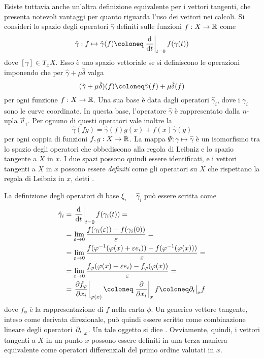 Esiste tuttavia anche un'altra definizione equivalente per i vettori tangenti, che presenta notevoli vantaggi per quanto riguarda l'uso dei vettori nei calcoli. Si consideri lo spazio degli operatori $\hat{\gamma}$ definiti sulle funzioni $f: X \to \mathbb{R}$ come 
\begin{equation}
  \hat{\gamma}: f \mapsto \hat{\gamma}(f) \defeq \eval{\dv{t}}_{t=0} f(\gamma(t)) 
\end{equation}
dove $[\gamma] \in T_x X$. Esso è uno spazio vettoriale se si definiscono le operazioni imponendo che per $\hat{\gamma} + \mu \hat{\delta}$ valga 
\begin{equation}
  (\hat{\gamma} + \mu \hat{\delta}) (f) \defeq \hat{\gamma}(f) + \mu \hat{\delta}(f)
\end{equation}
per ogni funzione $f:X\to \mathbb{R}$. Una sua base è data dagli operatori $\hat{\gamma}_i$, dove i $\gamma_i$ sono le curve coordinate. In questa base, l'operatore $\hat{\gamma}$ è rappresentato dalla $n$-upla $\vec{v}_\gamma$. Per ognuno di questi operatori vale inoltre la 
\begin{equation}
\hat{\gamma}(fg) = \hat{\gamma}(f)g(x) + f(x)\hat{\gamma}(g)
\end{equation}
per ogni coppia di funzioni $f,g:X\to \mathbb{R}$. La mappa $\Psi: \gamma \mapsto \hat{\gamma}$ è un isomorfismo tra lo spazio degli operatori che obbediscono alla regola di Leibniz e lo spazio tangente a $X$ in $x$. I due spazi possono quindi essere identificati, e i vettori tangenti a $X$ in $x$ possono essere \emph{definiti} come gli operatori su $X$ che rispettano la regola di Leibniz in $x$, detti .

La definizione degli operatori di base $\xi_i = \hat{\gamma}_i$ può essere scritta come \begin{equation}
\begin{aligned}
  \hat{\gamma}_i &= \eval{\dv{t}}_{t=0} f(\gamma_i(t)) = \\
  &= \lim_{\epsilon \to 0} \frac{f(\gamma_i(\epsilon))-f(\gamma_i(0))}{\epsilon} = \\
  &= \lim_{\epsilon \to 0} \frac{f(\phi^{-1}(\phi(x)+\epsilon e_i))-f(\phi^{-1}(\phi(x)))}{\epsilon} = \\
  &= \lim_{\epsilon \to 0} \frac{f_{\phi}(\phi(x)+\epsilon e_i)-f_{\phi}(\phi(x))}{\epsilon} = \\
  &= \eval{\pdv{f_{\phi}}{x_i}}_{\phi(x)} \defeq \eval{\pdv{x_i}}_x f \defeq \partial_i\big|_x f
\end{aligned}
\end{equation} 
dove $f_{\phi}$ è la rappresentazione di $f$ nella carta $\phi$. Un generico vettore tangente, inteso come derivata direzionale, può quindi essere scritto come combinazione lineare degli operatori $\eval{\partial_i}_x$. Un tale oggetto si dice . Ovviamente, quindi, i vettori tangenti a $X$ in un punto $x$ possono essere definiti in una terza maniera equivalente come operatori differenziali del primo ordine valutati in $x$.

